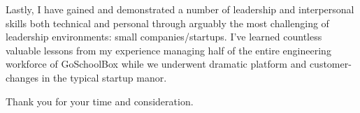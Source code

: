 \documentclass[11pt, a4paper]{awesome-cv-coverletter}
\begin{document}
\begin{cvletter}
Lastly, I have gained and demonstrated a number of leadership and interpersonal
skills both technical and personal through arguably the most challenging of
leadership environments: small companies/startups. I've learned countless
valuable lessons from my experience managing half of the entire engineering
workforce of GoSchoolBox while we underwent dramatic platform and
customer-changes in the typical startup manor. 

Thank you for your time and consideration.

\end{cvletter}


\makeletterclosing
\end{document}
